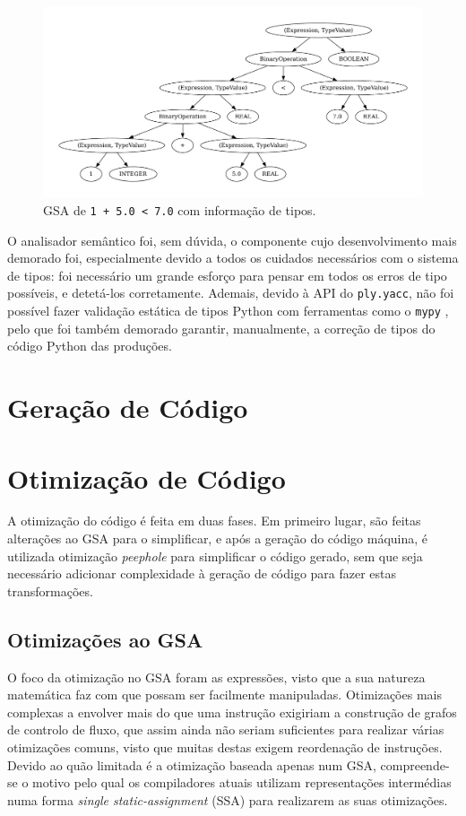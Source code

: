 \documentclass[12pt, a4paper]{article}
\begin{document}
\begin{figure}[H]
    \centering
    \includegraphics[width=\textwidth]{res/expression-types.pdf}
    \caption{GSA de \texttt{1 + 5.0 < 7.0} com informação de tipos.}
\end{figure}

O analisador semântico foi, sem dúvida, o componente cujo desenvolvimento mais demorado foi,
especialmente devido a todos os cuidados necessários com o sistema de tipos: foi necessário um
grande esforço para pensar em todos os erros de tipo possíveis, e detetá-los corretamente. Ademais,
devido à API do \texttt{ply.yacc}, não foi possível fazer validação estática de tipos Python com
ferramentas como o \texttt{mypy} \cite{mypy}, pelo que foi também demorado garantir, manualmente, a
correção de tipos do código Python das produções.

\section{Geração de Código}

\section{Otimização de Código}

A otimização do código é feita em duas fases. Em primeiro lugar, são feitas alterações ao GSA para o
simplificar, e após a geração do código máquina, é utilizada otimização \emph{peephole} para
simplificar o código gerado, sem que seja necessário adicionar complexidade à geração de código para
fazer estas transformações.

\subsection{Otimizações ao GSA}

O foco da otimização no GSA foram as expressões, visto que a sua natureza matemática faz com que
possam ser facilmente manipuladas. Otimizações mais complexas a envolver mais do que uma instrução
exigiriam a construção de grafos de controlo de fluxo, que assim ainda não seriam suficientes para
realizar várias otimizações comuns, visto que muitas destas exigem reordenação de instruções. Devido
ao quão limitada é a otimização baseada apenas num GSA, compreende-se o motivo pelo qual os
compiladores atuais utilizam representações intermédias numa forma \emph{single static-assignment}
(SSA) para realizarem as suas otimizações.
\end{document}
